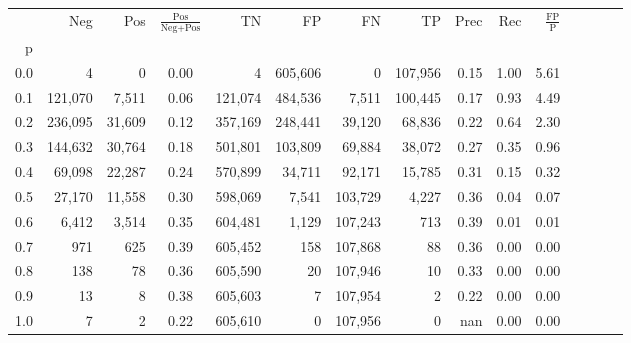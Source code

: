\begin{tabular}{rrrcrrrrrrrrrrr}
\toprule
{} &      Neg &     Pos & $\frac{\text{Pos}}{\text{Neg}+\text{Pos}}$ &       TN &       FP &       FN &       TP &  Prec &   Rec & $\frac{\text{FP}}{\text{P}}$ \\
p   &          &         &                                            &          &          &          &          &       &       &                              \\
\midrule
0.0 &        4 &       0 &                                       0.00 &        4 &  605,606 &        0 &  107,956 &  0.15 &  1.00 &                         5.61 \\
0.1 &  121,070 &   7,511 &                                       0.06 &  121,074 &  484,536 &    7,511 &  100,445 &  0.17 &  0.93 &                         4.49 \\
0.2 &  236,095 &  31,609 &                                       0.12 &  357,169 &  248,441 &   39,120 &   68,836 &  0.22 &  0.64 &                         2.30 \\
0.3 &  144,632 &  30,764 &                                       0.18 &  501,801 &  103,809 &   69,884 &   38,072 &  0.27 &  0.35 &                         0.96 \\
0.4 &   69,098 &  22,287 &                                       0.24 &  570,899 &   34,711 &   92,171 &   15,785 &  0.31 &  0.15 &                         0.32 \\
0.5 &   27,170 &  11,558 &                                       0.30 &  598,069 &    7,541 &  103,729 &    4,227 &  0.36 &  0.04 &                         0.07 \\
0.6 &    6,412 &   3,514 &                                       0.35 &  604,481 &    1,129 &  107,243 &      713 &  0.39 &  0.01 &                         0.01 \\
0.7 &      971 &     625 &                                       0.39 &  605,452 &      158 &  107,868 &       88 &  0.36 &  0.00 &                         0.00 \\
0.8 &      138 &      78 &                                       0.36 &  605,590 &       20 &  107,946 &       10 &  0.33 &  0.00 &                         0.00 \\
0.9 &       13 &       8 &                                       0.38 &  605,603 &        7 &  107,954 &        2 &  0.22 &  0.00 &                         0.00 \\
1.0 &        7 &       2 &                                       0.22 &  605,610 &        0 &  107,956 &        0 &   nan &  0.00 &                         0.00 \\
\bottomrule
\end{tabular}
